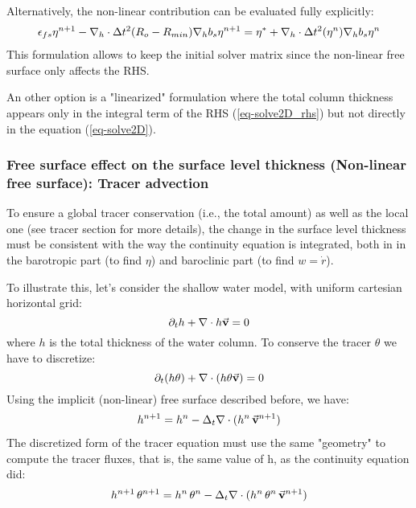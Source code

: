 Alternatively, the non-linear contribution can be evaluated fully
explicitly:
\begin{eqnarray*}
\epsilon_{fs} {\eta}^{n+1} -
{\bf \nabla}_h \cdot \Delta t^2 (R_o-R_{min})
{\bf \nabla}_h b_s {\eta}^{n+1}
= {\eta}^*
+{\bf \nabla}_h \cdot \Delta t^2 (\eta^{n})
{\bf \nabla}_h b_s {\eta}^{n}
\end{eqnarray*} 
This formulation allows to keep the initial solver matrix
since the non-linear free surface only affects the RHS.

An other option is a "linearized" formulation where the 
total column thickness appears only in the integral term of 
the RHS (\ref{eq-solve2D_rhs}) but not directly in 
the equation (\ref{eq-solve2D}).

\subsubsection{Free surface effect on the surface level thickness
(Non-linear free surface): Tracer advection}

To ensure a global tracer conservation (i.e., the total amount)
as well as the local one (see tracer section for more details), 
the change in the surface level thickness must be consistent with
the way the continuity equation is integrated, both in 
in the barotropic part (to find $\eta$) and baroclinic part
(to find $w = \dot{r}$).

To illustrate this, let's consider the shallow water model,
with uniform cartesian horizontal grid:
$$
\partial_t h + \nabla \cdot h \vec{\bf v} = 0
$$
where $h$ is the total thickness of the water column.
To conserve the tracer $\theta$ we have to discretize:
$$
\partial_t (h \theta) + \nabla \cdot ( h \theta \vec{\bf v})= 0
$$
Using the implicit (non-linear) free surface described before, we have:
\begin{eqnarray*}
h^{n+1} = h^{n} - \Delta_t \nabla \cdot (h^n \, \vec{\bf v}^{n+1} ) \\
\end{eqnarray*}
The discretized form of the tracer equation must use the same
"geometry" to compute the tracer fluxes, that is, the same value of
h, as the continuity equation did:
\begin{eqnarray*}
h^{n+1} \, \theta^{n+1} = h^n \, \theta^n 
        - \Delta_t \nabla \cdot (h^n \, \theta^n \, \vec{\bf v}^{n+1})
\end{eqnarray*}

